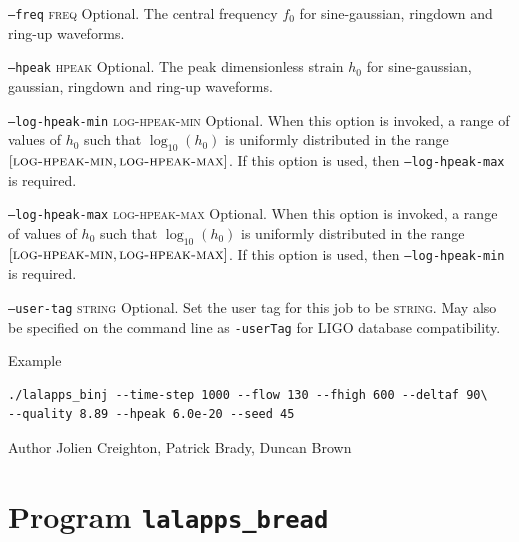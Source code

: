 \begin{entry}
\begin{entry}
\item[\texttt{--freq} \textsc{freq}]
Optional.  The central frequency $f_0$ for sine-gaussian,  ringdown and
ring-up waveforms.

\item[\texttt{--hpeak} \textsc{hpeak}]
Optional.  The peak dimensionless strain $h_0$ for sine-gaussian,  gaussian,  ringdown and
ring-up waveforms.

\item[\texttt{--log-hpeak-min} \textsc{log-hpeak-min}]
Optional.  When this option is invoked,  a range of values of $h_0$
such that $\log_{10}(h_0)$ is uniformly distributed in the range $[
\textsc{log-hpeak-min}, \textsc{log-hpeak-max}]$.  If this option is
used,  then \texttt{--log-hpeak-max} is required.

\item[\texttt{--log-hpeak-max} \textsc{log-hpeak-max}]
Optional.  When this option is invoked,  a range of values of $h_0$
such that $\log_{10}(h_0)$ is uniformly distributed in the range $[
\textsc{log-hpeak-min}, \textsc{log-hpeak-max}]$.  If this option is
used,  then \texttt{--log-hpeak-min} is required.

\item[\texttt{--user-tag} \textsc{string}] Optional. Set the user tag for this
job to be \textsc{string}. May also be specified on the command line as 
\texttt{-userTag} for LIGO database compatibility.

\end{entry}

\item[Example]
\begin{verbatim}
./lalapps_binj --time-step 1000 --flow 130 --fhigh 600 --deltaf 90\
--quality 8.89 --hpeak 6.0e-20 --seed 45
\end{verbatim}

\item[Author] 
Jolien Creighton, Patrick Brady, Duncan Brown
\end{entry}
\clearpage

\section{Program \texttt{lalapps\_bread}}
\label{program:lalapps-bread}


